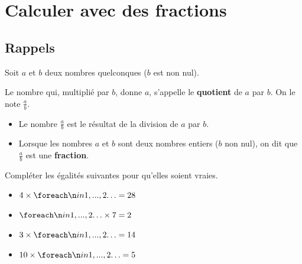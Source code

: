 \documentclass[a4paper]{book}
\begin{document}
\setcounter{chapter}{12}
\renewcommand{\monTitre}{Calculer avec des fractions}
\chapter{\monTitre}
\thispagestyle{fancy}


\section{Rappels}

    \begin{definition}
        Soit $a$ et $b$ deux nombres quelconques ($b$ est non nul).
        
        Le nombre qui, multiplié par $b$, donne $a$, s'appelle le \textbf{quotient} de $a$ par $b$. On le note $\frac{a}{b}$.
    \end{definition}
    
    
    \begin{remarque}
        \begin{itemize}
            \item Le nombre $\frac{a}{b}$ est le résultat de la division de $a$ par $b$.
            \item Lorsque les nombres $a$ et $b$ sont deux nombres entiers ($b$ non nul), on dit que $\frac{a}{b}$ est une \textbf{fraction}.
        \end{itemize}
    \end{remarque}
    
    
    \begin{exemple}
        Compléter les égalités suivantes pour qu'elles soient vraies.\medskip

        \begin{minipage}{0.49\linewidth}
            \begin{itemize}
                \item $4 \times \points[2] = 28$ \medskip
                \item $\points[2] \times 7 = 2$
            \end{itemize}
        \end{minipage}
        \hfill
        \begin{minipage}{0.49\linewidth}
            \begin{itemize}
                \item $3 \times \points[2] = 14$ \medskip
                \item $10 \times \points[2] = 5$
            \end{itemize}
        \end{minipage}
    \end{exemple}
    
\end{document}

